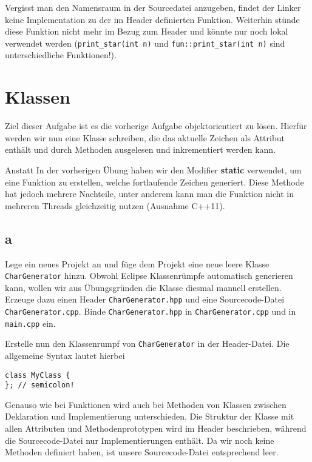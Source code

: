 Vergisst man den Namensraum in der Sourcedatei anzugeben, findet der Linker keine Implementation zu der im Header definierten Funktion.
Weiterhin stünde diese Funktion nicht mehr im Bezug zum Header und könnte nur noch lokal verwendet werden (\texttt{print\_star(int n)} und \texttt{fun::print\_star(int n)} sind unterschiedliche Funktionen!).

\newpage
\section{Klassen}
Ziel dieser Aufgabe ist es die vorherige Aufgabe objektorientiert zu lösen. Hierfür werden wir nun eine Klasse schreiben, die das aktuelle Zeichen als Attribut enthält und durch Methoden ausgelesen und inkrementiert werden kann.

Anstatt
In der vorherigen Übung haben wir den Modifier \textbf{static} verwendet, um eine Funktion zu erstellen, welche fortlaufende Zeichen generiert.
Diese Methode hat jedoch mehrere Nachteile, unter anderem kann man die Funktion nicht in mehreren Threads gleichzeitig nutzen (Ausnahme C++11).



\subsection{a}
Lege ein neues Projekt an und füge dem Projekt eine neue leere Klasse \texttt{CharGenerator} hinzu.
Obwohl Eclipse Klassenrümpfe automatisch generieren kann, wollen wir aus Übungsgründen die Klasse diesmal manuell erstellen.
Erzeuge dazu einen Header \texttt{CharGenerator.hpp} und eine Sourcecode-Datei \texttt{CharGenerator.cpp}.
Binde \texttt{CharGenerator.hpp} in \texttt{CharGenerator.cpp} und in \texttt{main.cpp} ein.

Erstelle nun den Klassenrumpf von \texttt{CharGenerator} in der Header-Datei. Die allgemeine Syntax lautet hierbei

\begin{lstlisting}
class MyClass {
}; // semicolon!
\end{lstlisting}

Genauso wie bei Funktionen wird auch bei Methoden von Klassen zwischen Deklaration und Implementierung unterschieden.
Die Struktur der Klasse mit allen Attributen und Methodenprototypen wird im Header beschrieben, während die Sourcecode-Datei nur Implementierungen enthält.
Da wir noch keine Methoden definiert haben, ist unsere Sourcecode-Datei entsprechend leer.


